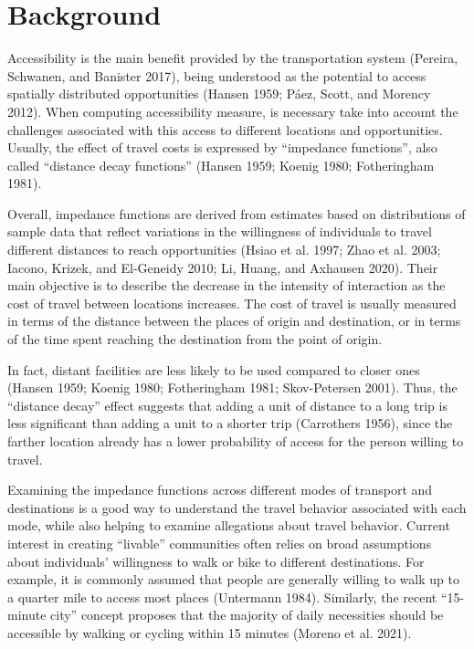 \documentclass[preprint, 3p,
authoryear]{elsarticle} %
\begin{document}
\section{Background}\label{background}

Accessibility is the main benefit provided by the transportation system
(Pereira, Schwanen, and Banister 2017), being understood as the
potential to access spatially distributed opportunities (Hansen 1959;
Páez, Scott, and Morency 2012). When computing accessibility measure, is
necessary take into account the challenges associated with this access
to different locations and opportunities. Usually, the effect of travel
costs is expressed by ``impedance functions'', also called ``distance
decay functions'' (Hansen 1959; Koenig 1980; Fotheringham 1981).

Overall, impedance functions are derived from estimates based on
distributions of sample data that reflect variations in the willingness
of individuals to travel different distances to reach opportunities
(Hsiao et al. 1997; Zhao et al. 2003; Iacono, Krizek, and El-Geneidy
2010; Li, Huang, and Axhausen 2020). Their main objective is to describe
the decrease in the intensity of interaction as the cost of travel
between locations increases. The cost of travel is usually measured in
terms of the distance between the places of origin and destination, or
in terms of the time spent reaching the destination from the point of
origin.

In fact, distant facilities are less likely to be used compared to
closer ones (Hansen 1959; Koenig 1980; Fotheringham 1981; Skov-Petersen
2001). Thus, the ``distance decay'' effect suggests that adding a unit
of distance to a long trip is less significant than adding a unit to a
shorter trip (Carrothers 1956), since the farther location already has a
lower probability of access for the person willing to travel.

Examining the impedance functions across different modes of transport
and destinations is a good way to understand the travel behavior
associated with each mode, while also helping to examine allegations
about travel behavior. Current interest in creating ``livable''
communities often relies on broad assumptions about individuals'
willingness to walk or bike to different destinations. For example, it
is commonly assumed that people are generally willing to walk up to a
quarter mile to access most places (Untermann 1984). Similarly, the
recent ``15-minute city'' concept proposes that the majority of daily
necessities should be accessible by walking or cycling within 15 minutes
(Moreno et al. 2021).
\end{document}
